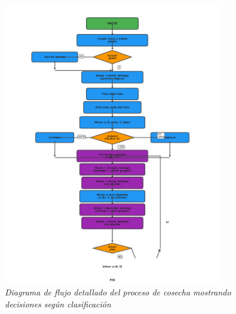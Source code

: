 \begin{figure}[H]
    \centering
    \includegraphics[width=0.85\textwidth]{imagenes/diagrama_flujo_cosecha.png}
    \caption{\textit{Diagrama de flujo detallado del proceso de cosecha mostrando decisiones según clasificación}}
    \label{fig:flujo_cosecha}
\end{figure}
